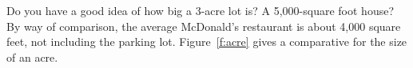 \item Do
you have a good idea of how big a 3-acre lot is? A 5,000-square foot
house? By way of comparison, the average McDonald's restaurant is about 4,000
square feet, not including the parking lot. Figure~\ref{f:acre} gives a
comparative for the size of an acre.


